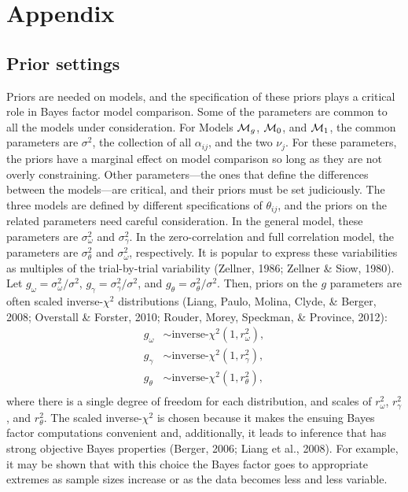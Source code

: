 \documentclass[english,man]{apa6}
\theoremstyle{definition}
\theoremstyle{definition}
\theoremstyle{remark}
\begin{document}
\newpage

\section{Appendix}\label{appendix}

\subsection{Prior settings}\label{prior-settings}

Priors are needed on models, and the specification of these priors plays
a critical role in Bayes factor model comparison. Some of the parameters
are common to all the models under consideration. For Models
\({\cal M}_g\), \({\cal M}_0\), and \({\cal M}_1\), the common parameters are
\(\sigma^2\), the collection of all \(\alpha_{ij}\), and the two
\(\nu_j\). For these parameters, the priors have a marginal effect on
model comparison so long as they are not overly constraining. Other
parameters---the ones that define the differences between the
models---are critical, and their priors must be set judiciously. The
three models are defined by different specifications of \(\theta_{ij}\),
and the priors on the related parameters need careful consideration. In
the general model, these parameters are \(\sigma^2_\omega\) and
\(\sigma^2_\gamma\). In the zero-correlation and full correlation model,
the parameters are \(\sigma^2_\theta\) and \(\sigma^2_\omega\),
respectively. It is popular to express these variabilities as multiples
of the trial-by-trial variability (Zellner, 1986; Zellner \& Siow,
1980). Let \(g_\omega=\sigma^2_\omega/\sigma^2\),
\(g_\gamma=\sigma^2_\gamma/\sigma^2\), and
\(g_\theta=\sigma^2_\theta/\sigma^2\). Then, priors on the \(g\)
parameters are often scaled inverse-\(\chi^2\) distributions (Liang,
Paulo, Molina, Clyde, \& Berger, 2008; Overstall \& Forster, 2010;
Rouder, Morey, Speckman, \& Province, 2012): \[
\begin{aligned}
g_\omega &\sim \mbox{inverse-$\chi^2$}(1,r^2_\omega),\\
g_\gamma &\sim \mbox{inverse-$\chi^2$}(1,r^2_\gamma),\\
g_\theta &\sim \mbox{inverse-$\chi^2$}(1,r^2_\theta),\\
\end{aligned}
\] where there is a single degree of freedom for each distribution, and
scales of \(r^2_\omega\), \(r^2_\gamma\), and \(r^2_\theta\). The scaled
inverse-\(\chi^2\) is chosen because it makes the ensuing Bayes factor
computations convenient and, additionally, it leads to inference that
has strong objective Bayes properties (Berger, 2006; Liang et al.,
2008). For example, it may be shown that with this choice the Bayes
factor goes to appropriate extremes as sample sizes increase or as the
data becomes less and less variable.
\end{document}
